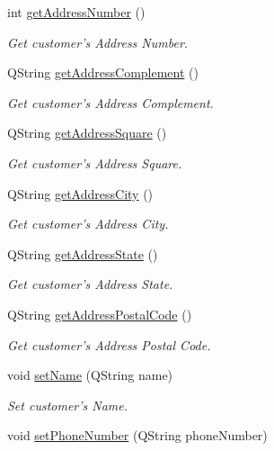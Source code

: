 \begin{DoxyCompactItemize}
int \hyperlink{class_customer_a4aebded79b3a48cf72639a7ace1a1358}{get\-Address\-Number} ()
\begin{DoxyCompactList}\small\item\em \-Get customer's \-Address \-Number. \end{DoxyCompactList}\item 
\-Q\-String \hyperlink{class_customer_ae52c439ce4460961f33698a2cc3696a0}{get\-Address\-Complement} ()
\begin{DoxyCompactList}\small\item\em \-Get customer's \-Address \-Complement. \end{DoxyCompactList}\item 
\-Q\-String \hyperlink{class_customer_a0b093c97bf9806a889f766af1fe9c080}{get\-Address\-Square} ()
\begin{DoxyCompactList}\small\item\em \-Get customer's \-Address \-Square. \end{DoxyCompactList}\item 
\-Q\-String \hyperlink{class_customer_aedcfe4356c45ba6472ff0d4f4641af74}{get\-Address\-City} ()
\begin{DoxyCompactList}\small\item\em \-Get customer's \-Address \-City. \end{DoxyCompactList}\item 
\-Q\-String \hyperlink{class_customer_a518f253a85d497a7e6d29ed5889d4af9}{get\-Address\-State} ()
\begin{DoxyCompactList}\small\item\em \-Get customer's \-Address \-State. \end{DoxyCompactList}\item 
\-Q\-String \hyperlink{class_customer_a3ecaaa7883c982fb2d34e38879ce3176}{get\-Address\-Postal\-Code} ()
\begin{DoxyCompactList}\small\item\em \-Get customer's \-Address \-Postal \-Code. \end{DoxyCompactList}\item 
void \hyperlink{class_customer_af7841c174717be73fd0d99cb677457e9}{set\-Name} (\-Q\-String name)
\begin{DoxyCompactList}\small\item\em \-Set customer's \-Name. \end{DoxyCompactList}\item 
void \hyperlink{class_customer_ade4f42f2fd87ad563d8ed3013f1269fb}{set\-Phone\-Number} (\-Q\-String phone\-Number)

\end{DoxyCompactItemize}
